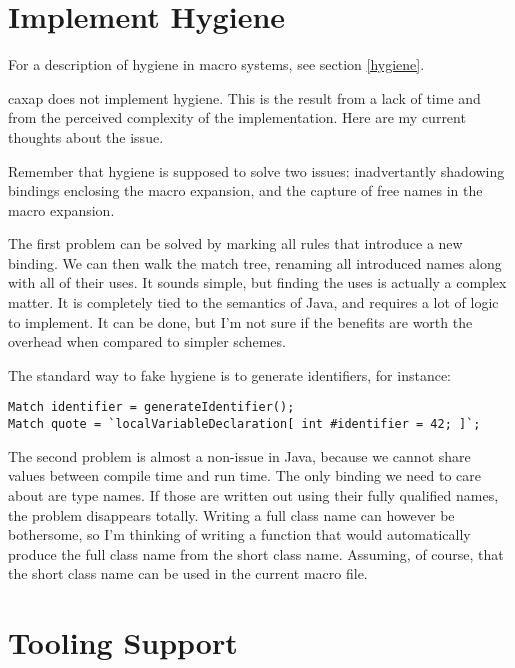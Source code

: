 \section{Implement Hygiene}
\label{implem_hygiene}

For a description of hygiene in macro systems, see section \ref{hygiene}.

caxap does not implement hygiene. This is the result from a lack of time and
from the perceived complexity of the implementation. Here are my current
thoughts about the issue.

Remember that hygiene is supposed to solve two issues: inadvertantly shadowing
bindings enclosing the macro expansion, and the capture of free names in the
macro expansion.

The first problem can be solved by marking all rules that introduce a new
binding. We can then walk the match tree, renaming all introduced names along
with all of their uses. It sounds simple, but finding the uses is actually a
complex matter. It is completely tied to the semantics of Java, and requires a
lot of logic to implement. It can be done, but I'm not sure if the benefits are
worth the overhead when compared to simpler schemes.

The standard way to fake hygiene is to generate identifiers, for instance:

\begin{lstlisting}
Match identifier = generateIdentifier();
Match quote = `localVariableDeclaration[ int #identifier = 42; ]`;
\end{lstlisting}

The second problem is almost a non-issue in Java, because we cannot share values
between compile time and run time. The only binding we need to care about are
type names. If those are written out using their fully qualified names, the
problem disappears totally. Writing a full class name can however be bothersome,
so I'm thinking of writing a function that would automatically produce the full
class name from the short class name. Assuming, of course, that the short class
name can be used in the current macro file.

\section{Tooling Support}

